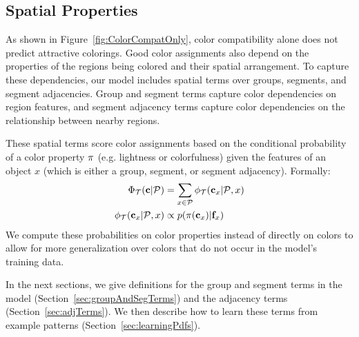 


\subsection{Spatial Properties}
\label{sec:spatialCompat}

As shown in Figure~\ref{fig:ColorCompatOnly}, color compatibility alone does not predict attractive colorings. Good color assignments also depend on the properties of the regions being colored and their spatial arrangement. To capture these dependencies, our model includes spatial terms over groups, segments, and segment adjacencies. Group and segment terms capture color dependencies on region features, and segment adjacency terms capture color dependencies on the relationship between nearby regions.

These spatial terms score color assignments based on the conditional probability of a color property $\pi$ (e.g. lightness or colorfulness) given the features of an object $x$ (which is either a group, segment, or segment adjacency). Formally:
\begin{align*}
	\Phi_{\mathcal{T}}(\mathbf{c} | \mathcal{P}) &= \sum_{x \in \mathcal{P}} \phi_{\mathcal{T}}(\mathbf{c}_x | \mathcal{P}, x) \\
	\phi_{\mathcal{T}}(\mathbf{c}_x | \mathcal{P}, x) &\propto p(\pi(\mathbf{c}_x) | \mathbf{f}_x)
\end{align*}
We compute these probabilities on color properties instead of directly on colors to allow for more generalization over colors that do not occur in the model's training data.

In the next sections, we give definitions for the group and segment terms in the model (Section~\ref{sec:groupAndSegTerms}) and the adjacency terms (Section~\ref{sec:adjTerms}). We then describe how to learn these terms from example patterns (Section~\ref{sec:learningPdfs}).

